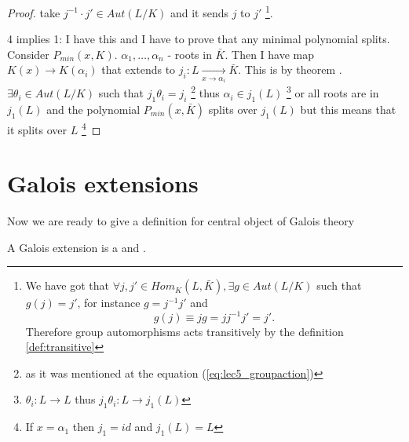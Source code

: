 \begin{theorem}
\begin{proof}
    take $j^{-1} \cdot j' \in Aut \left(L/K\right)$ and it sends $j$
    to $j'$
    \footnote{
      We have got that $\forall j, j' \in Hom_K\left(L,
      \bar{K}\right), \exists g \in Aut\left(L/K\right)$
      such that $g(j) = j'$, for instance $g = j^{-1}j'$ and
      \begin{equation}
        g(j) \equiv j g = j j^{-1} j' = j'.
        \label{eq:lec5_groupaction}
      \end{equation}
        Therefore group
      automorphisms acts transitively by the definition
      \ref{def:transitive}
    }.

    4 implies 1:  I have this  and I have to prove
    that any minimal polynomial splits. Consider
    $P_{min}\left(x, K\right)$. $\alpha_1, \dots, \alpha_n$ - roots in
    $\bar{K}$. Then I have map $K\left(x\right) \to
    K\left(\alpha_i\right)$ that extends to
    $j_i: L \xrightarrow[x \to \alpha_i]{} \bar{K}$. This is by
    theorem .
    $\exists \theta_i \in Aut\left(L/K\right)$ such that
    $j_1 \theta_i = j_i$
    \footnote{
      as it was mentioned at the equation (\ref{eq:lec5_groupaction})
    }
    thus
    $\alpha_i \in j_1\left(L\right)$
    \footnote{
      $\theta_i: L \to L$ thus $j_1 \theta_i: L \to j_1(L)$
    }
    or all roots are in
    $j_1\left(L\right)$ and the polynomial
    $P_{min}\left(x, \bar{K}\right)$ splits over $j_1\left(L\right)$
    but this means that it splits over $L$
    \footnote{
      If $x = \alpha_1$ then $j_1 = id$ and $j_1(L) = L$
    }
  \end{proof}
  \label{thm:lec5_3}
\end{theorem}

\section{Galois extensions}

Now we are ready to give a definition for central object of Galois
theory

\begin{definition}
  A Galois extension is a  and
  .
  \label{def:galoisextension}
\end{definition}

